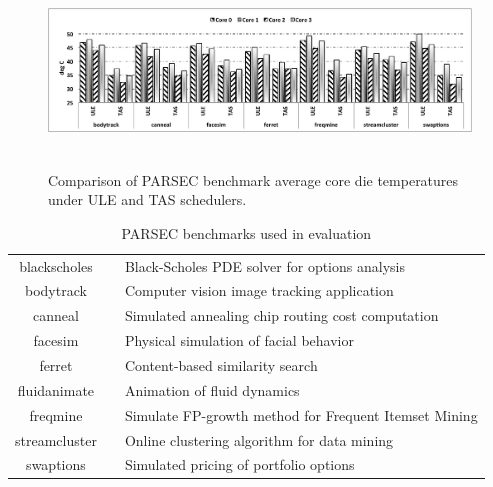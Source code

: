 \documentclass[times, 10pt,twocolumn]{IEEEtran}
\begin{document}
\begin{figure}[!tbp] 
\centering
  \includegraphics[width=1.0\linewidth,height=2in]{graphics/parsectemp}
  \caption{Comparison of PARSEC benchmark average core die temperatures
under ULE and TAS schedulers.}
  \label{fig:pbenchmarkt}
\end{figure}
\begin{table}[!b] 
\centering
  \caption{PARSEC benchmarks used in evaluation}
 \label{tab:parsecbench}
  \begin{tabular}[bthp]{c c p{5cm}} 
   \hline \hline 
blackscholes &  & Black-Scholes PDE solver for options analysis \\
bodytrack &  & Computer vision image tracking application \\
canneal &  & Simulated annealing chip routing cost computation \\
facesim &  & Physical simulation of facial behavior \\
ferret &  & Content-based similarity search \\
fluidanimate &  & Animation of fluid dynamics \\
freqmine &  & Simulate FP-growth method for Frequent Itemset Mining \\
streamcluster &  & Online clustering algorithm for data mining \\
swaptions &  & Simulated pricing of portfolio options \\
\hline
\end{tabular}

\end{table}
\end{document}
